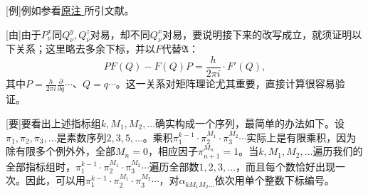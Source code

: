 \documentclass[fontsize=13pt,twoside,openany,headings=normal,parskip=false,bookmarkpackage=false,DIV=calc]{scrbook}
\begin{document}
[例]{例如参看\CJKglue \hyperlink{note-138}{原注 } 所引文献。}

[由]{由于$P_\nu^x$同$Q_\nu^y,\allowbreak Q_\nu^z$对易，却不同$Q_\nu^x$对易，要说明接下来的改写成立，就须证明以下关系；这里略去多余下标，并以$F$代替$\mathfrak A$：
\[
PF(Q)-F(Q)P=\frac h{2\pi i}\cdot F'(Q),
\]
其中$P=\frac h{2\pi i}\frac\partial{\partial q}\cdots$、$Q=q\cdots$。这一关系对矩阵理论尤其重要，直接计算很容易验证。}

[要]{要看出上述指标组$k,\allowbreak M_1,\allowbreak M_2,\allowbreak \ldots$确实构成一个序列，最简单的办法如下。设$\pi_1,\allowbreak \pi_2,\allowbreak \pi_3,\allowbreak \ldots$是素数序列$2,\allowbreak 3,\allowbreak 5,\allowbreak \ldots$。乘积$\pi_1^{k-1}\cdot\pi_2^{M_1}\cdot\pi_3^{M_2}\cdots$实际上是有限乘积，因为除有限多个例外外，全部$M_n=0$，相应因子$\pi_{n+1}^{M_n}=1$。当$k,\allowbreak M_1,\allowbreak M_2,\allowbreak \ldots$遍历我们的全部指标组时，$\pi_1^{k-1}\cdot\pi_2^{M_1}\cdot\pi_3^{M_2}\cdots$遍历全部数$1,\allowbreak 2,\allowbreak 3,\allowbreak \ldots$，而且每个数恰好出现一次。因此，可以用$\pi_1^{k-1}\cdot\pi_2^{M_1}\cdot\pi_3^{M_2}\cdots$，对$\alpha_{kM_1M_2\ldots}$依次用单个整数下标编号。}
\end{document}
